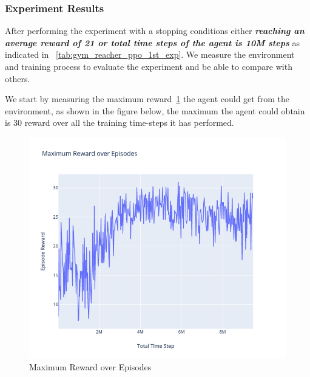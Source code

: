 \subsubsection{Experiment Results}

After performing the experiment with a stopping conditions either \textit{\textbf{reaching an average reward of 21 or total time steps of the agent is 10M steps}} as indicated in ~\ref{tab:gym_reacher_ppo_1st_exp}. We measure the environment and training process to evaluate the experiment and be able to compare with others.

We start by measuring the maximum reward~\ref{fig:1st_exp_max_eps_reward} the agent could get from the environment, as shown in the figure below, the maximum the agent could obtain is 30 reward over all the training time-steps it has performed.
\begin{figure}[!htb]
	\centering
	\includegraphics[width=\linewidth]{figures/exps/1st_exp/max_eps_reward}
	\caption{Maximum Reward over Episodes}
	\label{fig:1st_exp_max_eps_reward}
\end{figure}

